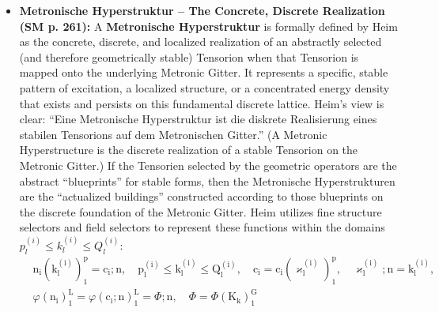 \documentclass[12pt]{article}
\newcommand{\q}[1]{\enquote{#1}}
\begin{document}
\begin{itemize}
    \item \textbf{Metronische Hyperstruktur – The Concrete, Discrete Realization (SM p. 261):}
    A \textbf{Metronische Hyperstruktur} is formally defined by Heim as the concrete, discrete, and localized realization of an abstractly selected (and therefore geometrically stable) Tensorion when that Tensorion is mapped onto the underlying Metronic Gitter. It represents a specific, stable pattern of excitation, a localized structure, or a concentrated energy density that exists and persists on this fundamental discrete lattice. Heim's view is clear: \q{Eine Metronische Hyperstruktur ist die diskrete Realisierung eines stabilen Tensorions auf dem Metronischen Gitter.} (A Metronic Hyperstructure is the discrete realization of a stable Tensorion on the Metronic Gitter.) If the Tensorien selected by the geometric operators are the abstract \q{blueprints} for stable forms, then the Metronische Hyperstrukturen are the \q{actualized buildings} constructed according to those blueprints on the discrete foundation of the Metronic Gitter.
    Heim utilizes fine structure selectors and field selectors to represent these functions within the domains $p^{(i)}_l \le k^{(i)}_l \le Q^{(i)}_l$:
    \begin{equation}
    \begin{aligned}
    & \mathrm{n_i}(\mathrm{k^{(i)}_l})_1^\mathrm{p} = \mathrm{c_i}; \mathrm{n}, \quad \mathrm{p^{(i)}_l} \le \mathrm{k^{(i)}_l} \le \mathrm{Q^{(i)}_l}, \quad \mathrm{c_i} = \mathrm{c_i}(\varkappa^{\mathrm{(i)}}_\mathrm{l})_1^\mathrm{p}, \quad \varkappa^{\mathrm{(i)}}_\mathrm{l}; \mathrm{n} = \mathrm{k^{(i)}_l}, \\
    & \varphi(\mathrm{n_i})_1^\mathrm{L} = \varphi(\mathrm{c_i};\mathrm{n})_1^\mathrm{L} = \Phi; \mathrm{n}, \quad \Phi = \Phi(\mathrm{K_k})_1^\mathrm{G}
    \end{aligned} \tag{86}
    \end{equation}


\end{itemize}
\end{document}
